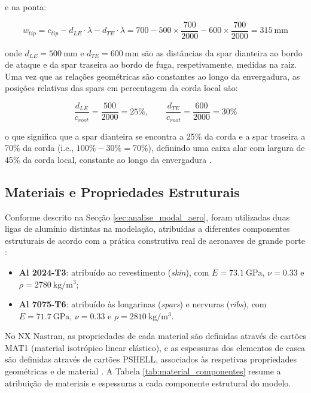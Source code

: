 \documentclass[a4paper,fleqn,noprintline]{cas-dc}
\begin{document}
\noindent e na ponta:

\begin{equation}
    w_{tip} = c_{tip} - d_{LE} \cdot \lambda - d_{TE} \cdot \lambda 
    = 700 - 500\times\frac{700}{2000} - 600\times\frac{700}{2000} 
    = \SI{315}{\milli\meter}
    \label{eq:largura_caixa_ponta}
\end{equation}

\noindent onde $d_{LE} = \SI{500}{\milli\meter}$ e $d_{TE} = \SI{600}{\milli\meter}$ são as distâncias da spar dianteira ao bordo de ataque e da spar traseira ao bordo de fuga, respetivamente, medidas na raiz. Uma vez que as relações geométricas são constantes ao longo da envergadura, as posições relativas das spars em percentagem da corda local são:

\begin{equation}
    \frac{d_{LE}}{c_{root}} = \frac{500}{2000} = 25\%, \qquad
    \frac{d_{TE}}{c_{root}} = \frac{600}{2000} = 30\%
    \label{eq:posicao_spars}
\end{equation}

\noindent o que significa que a spar dianteira se encontra a 25\% da corda e a spar traseira a 70\% da corda (i.e., $100\% - 30\% = 70\%$), definindo uma caixa alar com largura de 45\% da corda local, constante ao longo da envergadura \cite{Niu1988}.

\subsection{Materiais e Propriedades Estruturais}

Conforme descrito na Secção \ref{sec:analise_modal_aero}, foram utilizadas duas ligas de alumínio distintas na modelação, atribuídas a diferentes componentes estruturais de acordo com a prática construtiva real de aeronaves de grande porte \cite{Megson2012}:

\begin{itemize}
    \item \textbf{Al 2024-T3}: atribuído ao revestimento 
    (\textit{skin}), com $E = \SI{73.1}{\giga\pascal}$, 
    $\nu = 0.33$ e $\rho = \SI{2780}{\kilo\gram\per\cubic\meter}$;
    \item \textbf{Al 7075-T6}: atribuído às longarinas 
    (\textit{spars}) e nervuras (\textit{ribs}), com 
    $E = \SI{71.7}{\giga\pascal}$, $\nu = 0.33$ e 
    $\rho = \SI{2810}{\kilo\gram\per\cubic\meter}$.
\end{itemize}

No NX Nastran, as propriedades de cada material são definidas através de cartões MAT1 (material isotrópico linear elástico), e as espessuras dos elementos de casca são definidas através de cartões PSHELL, associados às respetivas propriedades geométricas e de material \cite{Nastran2014}. A Tabela \ref{tab:material_componentes} resume a atribuição de materiais e espessuras a cada componente estrutural do modelo.
\end{document}
